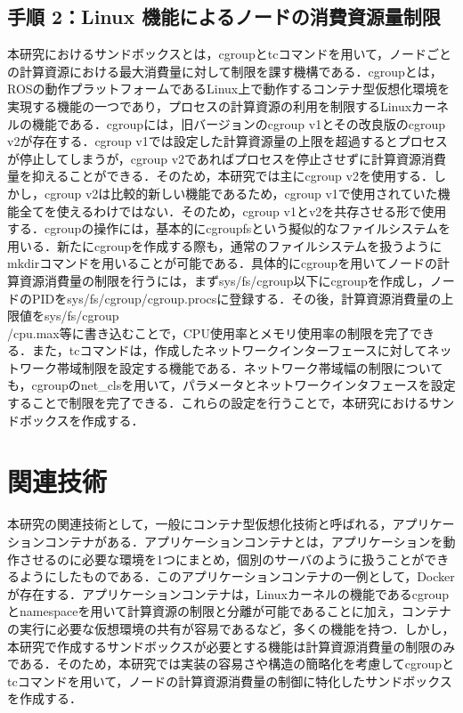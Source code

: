 \documentclass[11pt]{ujarticle} %
\begin{document}
\subsection{手順 2：Linux 機能によるノードの消費資源量制限}
本研究におけるサンドボックスとは，cgroupとtcコマンドを用いて，ノードごとの計算資源における最大消費量に対して制限を課す機構である．cgroupとは，ROSの動作プラットフォームであるLinux上で動作するコンテナ型仮想化環境を実現する機能の一つであり，プロセスの計算資源の利用を制限するLinuxカーネルの機能である\cite{cgroupMan}．cgroupには，旧バージョンのcgroup v1とその改良版のcgroup v2が存在する．cgroup v1では設定した計算資源量の上限を超過するとプロセスが停止してしまうが，cgroup v2であればプロセスを停止させずに計算資源消費量を抑えることができる．そのため，本研究では主にcgroup v2を使用する．しかし，cgroup v2は比較的新しい機能であるため，cgroup v1で使用されていた機能全てを使えるわけではない．そのため，cgroup v1とv2を共存させる形で使用する．cgroupの操作には，基本的にcgroupfsという擬似的なファイルシステムを用いる．新たにcgroupを作成する際も，通常のファイルシステムを扱うようにmkdirコマンドを用いることが可能である．具体的にcgroupを用いてノードの計算資源消費量の制限を行うには，まずsys/fs/cgroup以下にcgroupを作成し，ノードのPIDをsys/fs/cgroup/cgroup.procsに登録する．その後，計算資源消費量の上限値をsys/fs/cgroup\\/cpu.max等に書き込むことで，CPU使用率とメモリ使用率の制限を完了できる．また，tcコマンドは，作成したネットワークインターフェースに対してネットワーク帯域制限を設定する機能である．ネットワーク帯域幅の制限についても，cgroupのnet\_clsを用いて，パラメータとネットワークインタフェースを設定することで制限を完了できる．これらの設定を行うことで，本研究におけるサンドボックスを作成する．

\section{関連技術}
本研究の関連技術として，一般にコンテナ型仮想化技術と呼ばれる，アプリケーションコンテナがある．アプリケーションコンテナとは，アプリケーションを動作させるのに必要な環境を1つにまとめ，個別のサーバのように扱うことができるようにしたものである．このアプリケーションコンテナの一例として，Docker\cite{Docker}が存在する．アプリケーションコンテナは，Linuxカーネルの機能であるcgroupとnamespaceを用いて計算資源の制限と分離が可能であることに加え，コンテナの実行に必要な仮想環境の共有が容易であるなど，多くの機能を持つ．しかし，本研究で作成するサンドボックスが必要とする機能は計算資源消費量の制限のみである．そのため，本研究では実装の容易さや構造の簡略化を考慮してcgroupとtcコマンドを用いて，ノードの計算資源消費量の制御に特化したサンドボックスを作成する．
\end{document}
